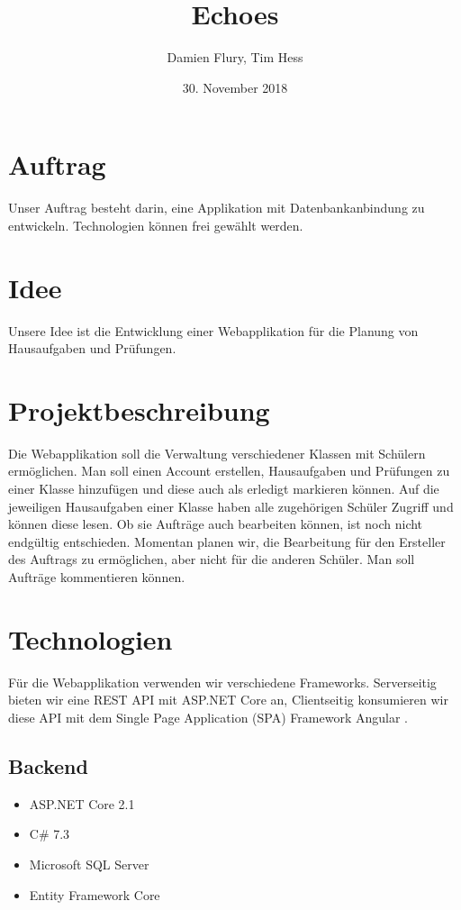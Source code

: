 \documentclass[a4paper, titlepage]{article}
\title{Echoes}
\author{Damien Flury, Tim Hess}
\date{30. November 2018}
\begin{document}
    \maketitle
    \tableofcontents
    \newpage
    
    \section{Auftrag}
    Unser Auftrag besteht darin, eine Applikation mit Datenbankanbindung zu entwickeln. Technologien
    können frei gewählt werden.
    \section{Idee}
    Unsere Idee ist die Entwicklung einer Webapplikation für die Planung von Hausaufgaben
    und Prüfungen. 
    \section{Projektbeschreibung}
    Die Webapplikation soll die Verwaltung verschiedener Klassen mit Schülern ermöglichen.
    Man soll einen Account erstellen, Hausaufgaben und Prüfungen zu einer Klasse hinzufügen
    und diese auch als erledigt markieren können. Auf die jeweiligen Hausaufgaben einer Klasse
    haben alle zugehörigen Schüler Zugriff und können diese lesen. Ob sie Aufträge auch bearbeiten
    können, ist noch nicht endgültig entschieden. Momentan planen wir, die Bearbeitung für den Ersteller
    des Auftrags zu ermöglichen, aber nicht für die anderen Schüler. Man soll Aufträge kommentieren
    können.
    \section{Technologien}
    Für die Webapplikation verwenden wir verschiedene Frameworks. Serverseitig bieten wir
    eine REST API mit ASP.NET Core \cite{Dotnet} an, Clientseitig konsumieren wir diese API mit dem Single
    Page Application (SPA) Framework Angular \cite{Angular}.
    \subsection{Backend}
    \begin{itemize}
        \item ASP.NET Core 2.1
        \item C\# 7.3
        \item Microsoft SQL Server
        \item Entity Framework Core
    \end{itemize}
\end{document}
